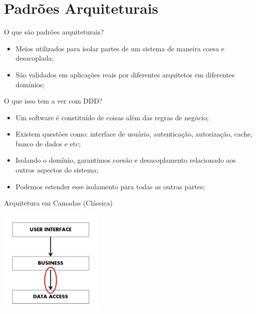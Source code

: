 \documentclass[aspectratio=169]{beamer}
\begin{document}
\section{Padrões Arquiteturais}
\begin{frame}{O que são padrões arquiteturais?}	
	\begin{itemize}	
		\item Meios utilizados para isolar partes de um sistema de maneira coesa e desacoplada;
		\item São validados em aplicações reais por diferentes arquitetos em diferentes domínios;
	\end{itemize}
\end{frame}

\begin{frame}{O que isso tem a ver com DDD?}	
	\begin{itemize}	
		\item Um software é constituído de coisas além das regras de negócio;
		\item Existem questões como: interface de usuário, autenticação, autorização, cache, banco de dados e etc;
		\item Isolando o domínio, garantimos coesão e desacoplamento relacionado aos outros aspectos do sistema;
		\item Podemos estender esse isolamento para todas as outras partes; 
	\end{itemize}
\end{frame}

\begin{frame}{Arquitetura em Camadas (Clássica)}	
	\begin{center}
		\includegraphics[width=5cm]{imgs/layered-architecture}
	\end{center}
\end{frame}
\end{document}
